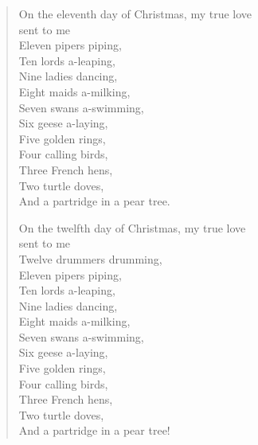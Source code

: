 \begin{verse}
\smallskip

On the eleventh day of Christmas, my true love \\ \hspace*{\fill} sent to me \\
Eleven pipers piping, \\
Ten lords a-leaping, \\
Nine ladies dancing, \\
Eight maids a-milking, \\
Seven swans a-swimming, \\
Six geese a-laying, \\
Five golden rings, \\
Four calling birds, \\
Three French hens, \\
Two turtle doves, \\
And a partridge in a pear tree.

\smallskip

On the twelfth day of Christmas, my true love \\ \hspace*{\fill} sent to me \\
Twelve drummers drumming, \\
Eleven pipers piping, \\
Ten lords a-leaping, \\
Nine ladies dancing, \\
Eight maids a-milking, \\
Seven swans a-swimming, \\
Six geese a-laying, \\
Five golden rings, \\
Four calling birds, \\
Three French hens, \\
Two turtle doves, \\
And a partridge in a pear tree! 
\end{verse}